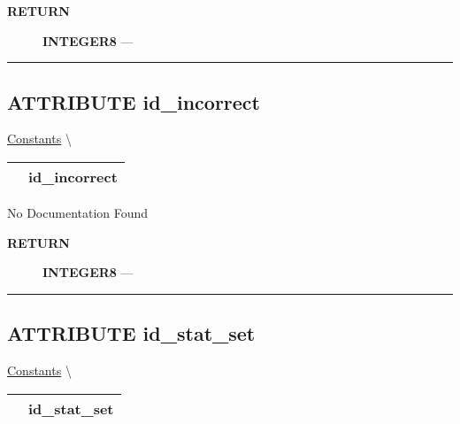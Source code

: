 \par
\begin{description}
\item [\colorbox{tagtype}{\color{white} \textbf{\textsf{RETURN}}}] \textbf{INTEGER8} --- 
\end{description}




\rule{\linewidth}{0.5pt}
\subsection*{\textsf{\colorbox{headtoc}{\color{white} ATTRIBUTE}
id\_incorrect}}

\hypertarget{ecldoc:logisticregression.constants.id_incorrect}{}
\hspace{0pt} \hyperlink{ecldoc:LogisticRegression.Constants}{Constants} \textbackslash 

{\renewcommand{\arraystretch}{1.5}
\begin{tabularx}{\textwidth}{|>{\raggedright\arraybackslash}l|X|}
\hline
\hspace{0pt}\mytexttt{\color{red} } & \textbf{id\_incorrect} \\
\hline
\end{tabularx}
}

\par





No Documentation Found








\par
\begin{description}
\item [\colorbox{tagtype}{\color{white} \textbf{\textsf{RETURN}}}] \textbf{INTEGER8} --- 
\end{description}




\rule{\linewidth}{0.5pt}
\subsection*{\textsf{\colorbox{headtoc}{\color{white} ATTRIBUTE}
id\_stat\_set}}

\hypertarget{ecldoc:logisticregression.constants.id_stat_set}{}
\hspace{0pt} \hyperlink{ecldoc:LogisticRegression.Constants}{Constants} \textbackslash 

{\renewcommand{\arraystretch}{1.5}
\begin{tabularx}{\textwidth}{|>{\raggedright\arraybackslash}l|X|}
\hline
\hspace{0pt}\mytexttt{\color{red} } & \textbf{id\_stat\_set} \\
\hline
\end{tabularx}
}

